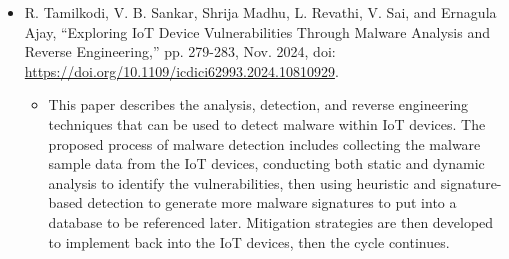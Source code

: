 \documentclass[12pt, a4paper]{article}
\begin{document}
    \begin{itemize}
        \item R. Tamilkodi, V. B. Sankar, Shrija Madhu, L. Revathi, V. Sai, and Ernagula Ajay, 
        “Exploring IoT Device Vulnerabilities Through Malware Analysis and Reverse Engineering,” pp. 279-283, Nov. 2024, 
        doi: \url{https://doi.org/10.1109/icdici62993.2024.10810929}. 
        \begin{itemize}
            \item This paper describes the analysis, detection, and reverse engineering techniques that can be used to detect malware within IoT devices.
            The proposed process of malware detection includes collecting the malware sample data from the IoT devices, 
            conducting both static and dynamic analysis to identify the vulnerabilities, 
            then using heuristic and signature-based detection to generate more malware signatures to put into a database to be referenced later. 
            Mitigation strategies are then developed to implement back into the IoT devices, then the cycle continues. 
        \end{itemize}        
    \end{itemize}
\end{document}
